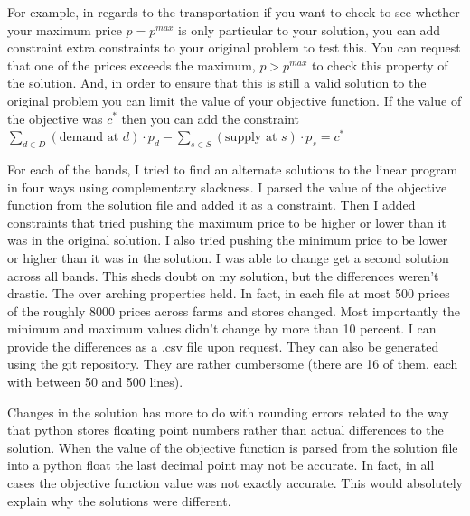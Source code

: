 \documentclass{report}
\begin{document}
For example, in regards to the transportation if you want to check to see whether your maximum price $p = p^{max}$ is only particular to your solution, you can add constraint extra constraints to your original problem to test this. You can request that one of the prices exceeds the maximum, $p > p^{max}$ to check this property of the solution. And, in order to ensure that this is still a valid solution to the original problem you can limit the value of your objective function. If the value of the objective was $c^*$ then you can add the constraint  $ \sum_{d \in D}  (\text{demand at } d) \cdot p_{d} -   \sum_{s \in S}  (\text{supply at } s) \cdot p_{s} = c^*$

For each of the bands, I tried to find an alternate solutions to the linear program in four ways using complementary slackness. I parsed the value of the objective function from the solution file and added it as a constraint. Then I added constraints that tried pushing the maximum price to be higher or lower than it was in the original solution. I also tried pushing the minimum price to be lower or higher than it was in the solution. I was able to change get a second solution across all bands. This sheds doubt on my solution, but the differences weren't drastic. The over arching properties held. In fact, in each file at most 500 prices of the roughly 8000 prices across farms and stores changed. Most importantly the minimum and maximum values didn't change by more than 10 percent. I can provide the differences as a .csv file upon request. They can also be generated using the git repository. They are rather cumbersome (there are 16 of them, each with between 50 and 500 lines).

Changes in the solution has more to do with rounding errors related to the way that python stores floating point numbers rather than actual differences to the solution. When the value of the objective function is parsed from the solution file into a python float the last decimal point may not be accurate. In fact, in all cases the objective function value was not exactly accurate. This would absolutely explain why the solutions were different.


\end{document}
